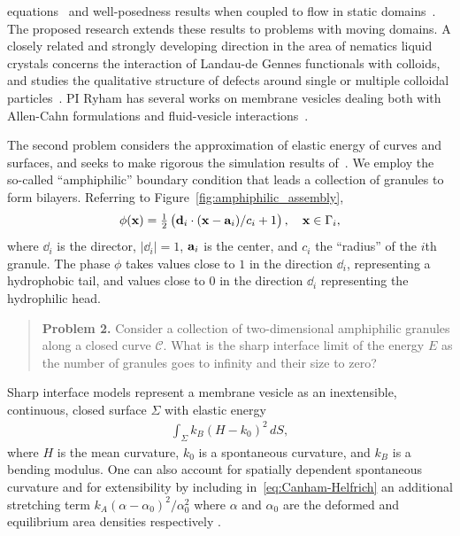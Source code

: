 equations~\cite{Christlieb2019CompetitionAC, Gavish2011CurvatureDF,
Dai2019WeakSF, Promislow2017ExistenceBA, Dai2015CompetitiveGE,
Promislow2012CriticalPO, Dai2022GeometricEO, Dai2020MinimizersFT,
Dai2013GeometricEO, Promislow2022UndulatedBI, Gera2017CahnHilliardOS}
and well-posedness
results when coupled to flow in static domains~\cite{Jiang2017TwophaseIF,
Liu2012StrongSF, Giorgini2019WellPosednessOA, Wu2022WellposednessOA,
Gal2010AsymptoticBO, Giorgini2020DiffuseIM, Giorgini2019UniquenessAR}.
The proposed research extends these results to problems with moving
domains. A closely related and strongly developing direction in the area
of nematics liquid crystals concerns the interaction of Landau-de Gennes
functionals with colloids, and studies the qualitative structure of
defects around single or multiple colloidal
particles~\cite{doi:10.1098/rsta.2020.0432, Alama2015MinimizersOT,
Alama2021SaturnRD, PhysRevE.96.042702}.
PI Ryham has several works on
membrane vesicles dealing both with Allen-Cahn formulations and
fluid-vesicle interactions~\cite{QiangDu09, RYHAM20112929, RyCoEi12,
Ryham2017OnTV}.

The second problem considers the approximation of elastic energy of
curves and surfaces, and seeks to make rigorous the simulation results
of~\cite{FuQuRyYo22, Fu2018_SIAM}. We employ the so-called
``amphiphilic'' boundary condition that leads a collection of
granules to form bilayers. Referring to
Figure~\ref{fig:amphiphilic_assembly}, 
\begin{align}
\label{eq:amphiphilic_BC}
  \phi(\xx) = \tfrac{1}{2}\left(\dd_i \cdot 
    (\xx - \aa_i)/c_i + 1\right), \quad \xx \in \Gamma_i,
\end{align}
where $\dd_i$ is the director, $|\dd_i| = 1$, $\aa_i$ is the center, and
$c_i$ the ``radius'' of the $i$th granule. The phase $\phi$ takes values
close to $1$ in the direction $\dd_i$, representing a hydrophobic tail,
and values close to $0$ in the direction $\dd_i$ representing the
hydrophilic head.

\begin{quotation}
  \noindent
  \textbf{Problem 2.}
  Consider a collection of two-dimensional amphiphilic granules along a
  closed curve $\mathcal{C}$. What is the sharp interface limit of the
  energy $E$ as the number of granules goes to infinity and their size
  to zero?
\end{quotation}

Sharp interface models represent a membrane vesicle as an
inextensible, continuous, closed surface $\Sigma$ with elastic energy
\begin{align}
  \label{eq:Canham-Helfrich}
  \int_{\Sigma} k_B(H - k_0)^2\, dS,
\end{align}
where $H$ is the mean curvature, $k_0$ is a spontaneous curvature, and
$k_B$ is a bending modulus. One can also account
for spatially dependent spontaneous curvature
\cite{PhysRevE.79.031926,Lowengrub13,mahapatra_saintillan_rangamani_2020}
and for extensibility by
including in~\eqref{eq:Canham-Helfrich} an additional stretching term
$k_A(\alpha - \alpha_0)^2/\alpha_0^2$ where $\alpha$ and $\alpha_0$ are
the deformed and equilibrium area densities respectively
\cite{chabanon2017}.

